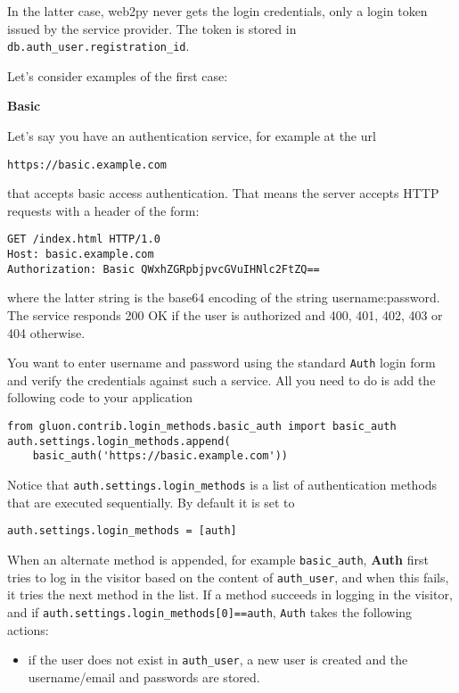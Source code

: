 \documentclass[justified,sixbynine,notoc]{tufte-book}
\def\ft{\small\tt}
\begin{document}
\begin{fullwidth}
In the latter case, web2py never gets the login credentials, only a login token issued by the service provider. The token is stored in {\ft db.auth\_user.registration\_id}.

Let's consider examples of the first case:

{\bf Basic}

Let's say you have an authentication service, for example at the url

\begin{lstlisting}[keywords={}]
https://basic.example.com
\end{lstlisting}
\noindent that accepts basic access authentication. That means the server accepts HTTP requests with a header of the form:

\begin{lstlisting}
GET /index.html HTTP/1.0
Host: basic.example.com
Authorization: Basic QWxhZGRpbjpvcGVuIHNlc2FtZQ==
\end{lstlisting}
\noindent where the latter string is the base64 encoding of the string username:password. The service responds 200 OK if the user is authorized and 400, 401, 402, 403 or 404 otherwise.

You want to enter username and password using the standard {\ft Auth} login form and verify the credentials against such a service. All you need to do is add the following code to your application
\begin{lstlisting}
from gluon.contrib.login_methods.basic_auth import basic_auth
auth.settings.login_methods.append(
    basic_auth('https://basic.example.com'))
\end{lstlisting}

Notice that {\ft auth.settings.login\_methods} is a list of authentication methods that are executed sequentially.
By default it is set to
\begin{lstlisting}
auth.settings.login_methods = [auth]
\end{lstlisting}

When an alternate method is appended, for example {\ft basic\_auth}, {\bf Auth} first tries to log in the visitor based on the content of {\ft auth\_user}, and when this fails, it tries the next method in the list. If a method succeeds in logging in the visitor, and if {\ft auth.settings.login\_methods[0]==auth}, {\ft Auth} takes the following actions:
\begin{itemize}
\item if the user does not exist in {\ft auth\_user}, a new user is created and the username/email and passwords are stored.


\end{itemize}
\end{fullwidth}
\end{document}
